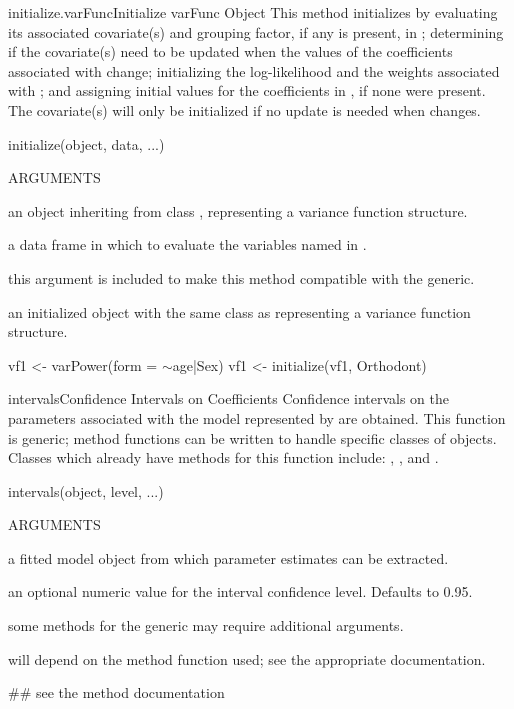 \documentclass[pdftex]{article} \usepackage{url,graphicx}
\renewcommand{\Twiddle}{\mbox{\(\sim\)}}
\begin{document}
\begin{Helpfile}{initialize.varFunc}{Initialize varFunc Object}
This method initializes  by evaluating its associated
covariate(s) and grouping factor, if any is present, in ;
determining if the covariate(s) need to be updated when the
values of the coefficients associated with  change;
initializing the log-likelihood and the weights associated with
; and assigning initial values for the coefficients in
, if none were present. The covariate(s) will only be
initialized if no update is needed when  changes.
\begin{Example}
initialize(object, data, ...)
\end{Example}
\begin{Argument}{ARGUMENTS}
\item[\Co{object:}]
an object inheriting from class ,
representing a variance function structure.
\item[\Co{data:}]
a data frame in which to evaluate the variables named in
. 
\item[\Co{...:}]
this argument is included to make this method compatible
with the generic.
\end{Argument}
an initialized object with the same class as 
representing a variance function structure.
\need 15pt
\vspace{-16pt} 
\begin{Example}
vf1 <- varPower(form = \Twiddle age|Sex)
vf1 <- initialize(vf1, Orthodont)
\end{Example}
\end{Helpfile}
\begin{Helpfile}{intervals}{Confidence Intervals on Coefficients}
Confidence intervals on the parameters associated with the model
represented by  are obtained. This function is generic;
method functions can be written to handle specific classes of
objects. Classes which already have methods for this function include:
, , and .
\begin{Example}
intervals(object, level, ...)
\end{Example}
\begin{Argument}{ARGUMENTS}
\item[\Co{object:}]
a fitted model object from which parameter estimates can
be extracted.
\item[\Co{level:}]
an optional numeric value for the interval confidence
level. Defaults to 0.95.
\item[\Co{...:}]
some methods for the generic may require additional
arguments.
\end{Argument}
will depend on the method function used; see the appropriate documentation.
\need 15pt
\vspace{-16pt} 
\begin{Example}
## see the method documentation
\end{Example}
\end{Helpfile}
\end{document}
